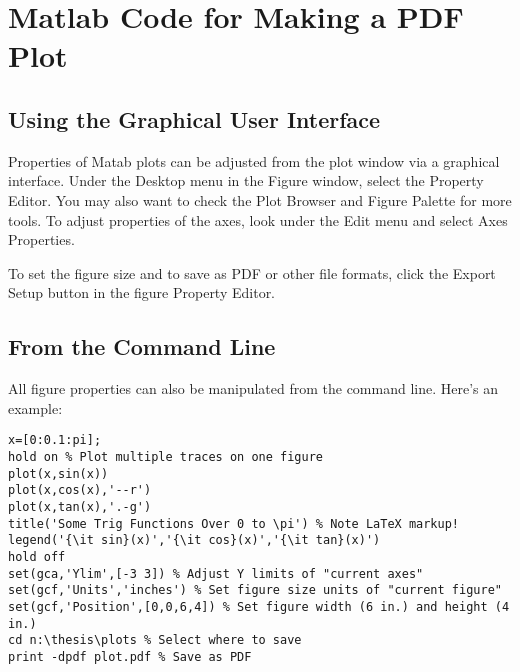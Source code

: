 \documentclass[letterpaper,12pt,titlepage,oneside,final]{book}
\let\origdoublepage\cleardoublepage
\newcommand{\clearemptydoublepage}{%
  \clearpage{\pagestyle{empty}\origdoublepage}}
\let\cleardoublepage\clearemptydoublepage
\begin{document}
\chapter[PDF Plots From Matlab]{Matlab Code for Making a PDF Plot}
\label{AppendixA}
\section{Using the Graphical User Interface}
Properties of Matab plots can be adjusted from the plot window via a graphical interface. Under the Desktop menu in the Figure window, select the Property Editor. You may also want to check the Plot Browser and Figure Palette for more tools. To adjust properties of the axes, look under the Edit menu and select Axes Properties.

To set the figure size and to save as PDF or other file formats, click the Export Setup button in the figure Property Editor.

\section{From the Command Line} 
All figure properties can also be manipulated from the command line. Here's an example: 
\begin{verbatim}
x=[0:0.1:pi];
hold on % Plot multiple traces on one figure
plot(x,sin(x))
plot(x,cos(x),'--r')
plot(x,tan(x),'.-g')
title('Some Trig Functions Over 0 to \pi') % Note LaTeX markup!
legend('{\it sin}(x)','{\it cos}(x)','{\it tan}(x)')
hold off
set(gca,'Ylim',[-3 3]) % Adjust Y limits of "current axes"
set(gcf,'Units','inches') % Set figure size units of "current figure"
set(gcf,'Position',[0,0,6,4]) % Set figure width (6 in.) and height (4 in.)
cd n:\thesis\plots % Select where to save
print -dpdf plot.pdf % Save as PDF
\end{verbatim}

\printglossary
\cleardoublepage
{}		%

\end{document}
